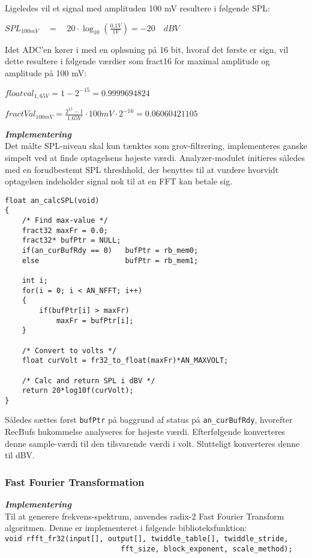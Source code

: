 Ligeledes vil et signal med amplituden 100 mV resultere i følgende SPL:
\begin{center}
${ SPL }_{ 100mV }\quad =\quad 20\cdot \log _{ 10 }{ \left( \frac { 0.1V }{ 1V }  \right)  } =-20\quad dBV$
\end{center}

Idet ADC'en kører i med en opløsning på 16 bit, hvoraf det første er sign, vil dette resultere i følgende værdier som fract16 for maximal amplitude og amplitude på 100 mV:
\begin{center}
${ floatval }_{ 1,65V }=1-{ 2 }^{ -15 }=0.9999694824$ 
\end{center}
\begin{center}
$fractVal_{ 100mV }=\frac { { 2 }^{ 15 }-1 }{ 1.65V } \cdot 100mV\cdot { 2 }^{ -16 }=0.06060421105$
\end{center}

\textbf{\textit{Implementering}} \\
Det målte SPL-niveau skal kun tænktes som grov-filtrering, implementeres ganske simpelt ved at finde optagelsens højeste værdi. Analyzer-modulet initieres således med en forudbestemt SPL threshhold, der benyttes til at vurdere hvorvidt optagelsen indeholder signal nok til at en FFT kan betale sig.
\begin{verbatim}
float an_calcSPL(void)
{
    /* Find max-value */
    fract32 maxFr = 0.0;
    fract32* bufPtr = NULL;
    if(an_curBufRdy == 0)   bufPtr = rb_mem0;
    else                    bufPtr = rb_mem1;
	
    int i;
    for(i = 0; i < AN_NFFT; i++)
    {
        if(bufPtr[i] > maxFr)
            maxFr = bufPtr[i];
    }
    
    /* Convert to volts */
    float curVolt = fr32_to_float(maxFr)*AN_MAXVOLT;
	
    /* Calc and return SPL i dBV */
    return 20*log10f(curVolt);
}
\end{verbatim}
Således sættes først \verb+bufPtr+ på baggrund af status på \verb+an_curBufRdy+, hvorefter RecBufs hukommelse analyseres for højeste værdi. Efterfølgende konverteres denne sample-værdi til den tilsvarende værdi i volt. Slutteligt konverteres denne til dBV.

\subsubsection{Fast Fourier Transformation}
\textbf{\textit{Implementering}} \\
Til at generere frekvens-spektrum, anvendes radix-2 Fast Fourier Transform algoritmen. Denne er implementeret i følgende biblioteksfunktion: \\
\verb+void rfft_fr32(input[], output[], twiddle_table[], twiddle_stride, + \\
\verb+                           fft_size, block_exponent, scale_method);+

